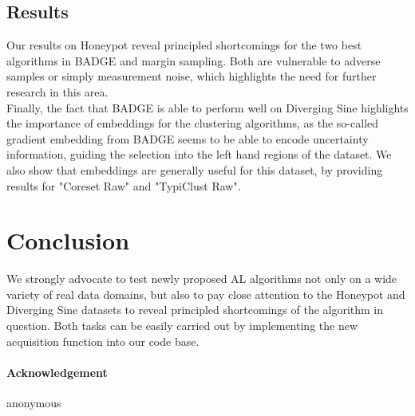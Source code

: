 \documentclass[]{article}
\begin{document}
\subsection{Results}
Our results on Honeypot reveal principled shortcomings for the two best algorithms in BADGE and margin sampling.
Both are vulnerable to adverse samples or simply measurement noise, which highlights the need for further research in this area. \\
Finally, the fact that BADGE is able to perform well on Diverging Sine highlights the importance of embeddings for the clustering algorithms, as the so-called gradient embedding from BADGE seems to be able to encode uncertainty information, guiding the selection into the left hand regions of the dataset. 
We also show that embeddings are generally useful for this dataset, by providing results for "Coreset Raw" and "TypiClust Raw".


\section{Conclusion}
We strongly advocate to test newly proposed AL algorithms not only on a wide variety of real data domains, but also to pay close attention to the Honeypot and Diverging Sine datasets to reveal principled shortcomings of the algorithm in question.
Both tasks can be easily carried out by implementing the new acquisition function into our code base.


\newpage
\paragraph{Acknowledgement}
anonymous




 
\end{document}
